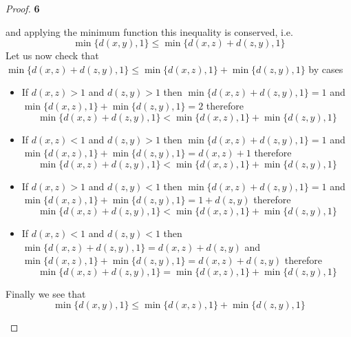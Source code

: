 \documentclass[11pt]{article}
\theoremstyle{definition}
\begin{document}
\begin{proof}{\textbf{6}}
\begin{itemize}
            and applying the minimum function this inequality is conserved, i.e.
            $$\min\{d(x,y), 1\} \leq \min\{d(x,z) + d(z,y), 1\}$$
            Let us now check that
            $\min\{d(x,z) + d(z,y), 1\} \leq \min\{d(x,z), 1\} + \min\{d(z,y), 1\}$ by
            cases
            \begin{itemize}
                \item If $d(x,z) > 1$ and $d(z,y) > 1$ then 
                $\min\{d(x,z) + d(z,y), 1\} = 1$ and $\min\{d(x,z), 1\} + \min\{d(z,y), 1\} = 2$
                therefore
                $$\min\{d(x,z) + d(z,y), 1\} < \min\{d(x,z), 1\} + \min\{d(z,y), 1\}$$
                \item If $d(x,z) < 1$ and $d(z,y) > 1$ then
                $\min\{d(x,z) + d(z,y), 1\} = 1$ and
                $\min\{d(x,z), 1\} + \min\{d(z,y), 1\} = d(x,z) + 1$ therefore
                $$\min\{d(x,z) + d(z,y), 1\} < \min\{d(x,z), 1\} + \min\{d(z,y), 1\}$$
                \item If $d(x,z) > 1$ and $d(z,y) < 1$ then
                $\min\{d(x,z) + d(z,y), 1\} = 1$ and
                $\min\{d(x,z), 1\} + \min\{d(z,y), 1\} = 1 + d(z,y)$ therefore
                $$\min\{d(x,z) + d(z,y), 1\} < \min\{d(x,z), 1\} + \min\{d(z,y), 1\}$$
                \item If $d(x,z) < 1$ and $d(z,y) < 1$ then
                $\min\{d(x,z) + d(z,y), 1\} = d(x,z) + d(z,y)$ and
                $\min\{d(x,z), 1\} + \min\{d(z,y), 1\} = d(x,z) + d(z,y)$ therefore
                $$\min\{d(x,z) + d(z,y), 1\} = \min\{d(x,z), 1\} + \min\{d(z,y), 1\}$$                
            \end{itemize}
            Finally we see that
            $$\min\{d(x,y), 1\} \leq \min\{d(x,z), 1\} + \min\{d(z,y), 1\}$$
        \end{itemize}
    \end{proof}
\end{document}

